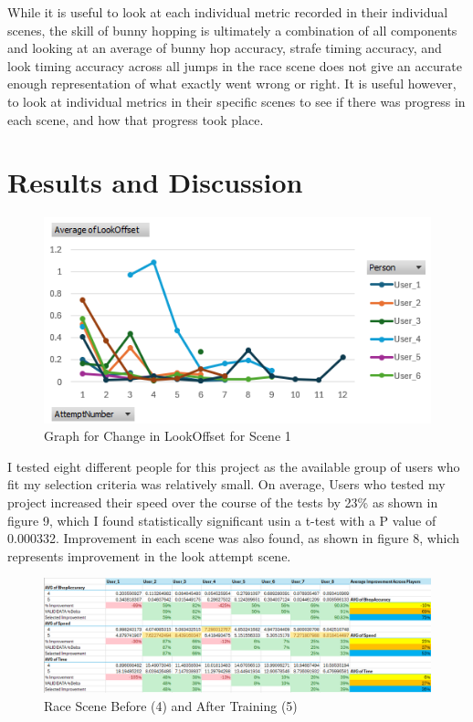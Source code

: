 \documentclass[10pt,twocolumn]{article}
\begin{document}
While it is useful to look at each individual metric recorded in their individual scenes, the skill of bunny hopping is ultimately a combination of all components and looking at an average of bunny hop accuracy, strafe timing accuracy, and look timing accuracy across all jumps in the race scene does not give an accurate enough representation of what exactly went wrong or right. It is useful however, to look at individual metrics in their specific scenes to see if there was progress in each scene, and how that progress took place.

\section{Results and Discussion}

\begin{figure}
    \includegraphics[width=1\linewidth]{LookOffsetGraph.png}
    \caption{Graph for Change in LookOffset for Scene 1}
\end{figure}
I tested eight different people for this project as the available group of users who fit my selection criteria was relatively small. On average, Users who tested my project increased their speed over the course of the tests by 23\% as shown in figure 9, which I found statistically significant usin a t-test with a P value of 0.000332. Improvement in each scene was also found, as shown in figure 8, which represents improvement in the look attempt scene.

\begin{figure}
    \centering
    \includegraphics[width=1\linewidth]{RaceData.png}
    \caption{Race Scene Before (4) and After Training (5)}
\end{figure}
\end{document}
